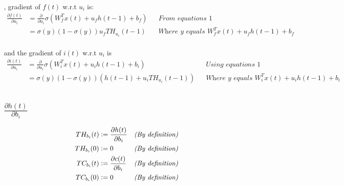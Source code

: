 \documentclass[twoside,11pt]{article}
\begin{document}
, gradient of $f(t)$  w.r.t $u_i$ is:
\begin{align*}
\frac{\partial f(t)}{\partial u_i} &=  \frac{\partial}{\partial u_i} \sigma(W_{f}^T x(t) + u_{f} h(t-1) + b_f) && \textit{From equations 1} \\
&= \sigma(y)(1-\sigma(y))u_f TH_{u_i}(t-1) && \textit{Where $y$ equals $W_{f}^T x(t) + u_{f} h(t-1) + b_f$} \\
\end{align*}

and the gradient of $i(t)$  w.r.t $u_i$ is
\begin{align*}
\frac{\partial i(t)}{\partial u_i} &=  \frac{\partial}{\partial u_i} \sigma(W_{i}^T x(t) + u_{i} h(t-1) + b_i) && \textit{Using equations 1} \\
&= \sigma(y)(1-\sigma(y)) \left (h(t-1)+ u_i TH_{u_{i}}(t-1) \right )&& \textit{Where $y$ equals $W_{i}^T x(t) + u_{i} h(t-1) + b_i$} \\
\end{align*}

\subsection{$\frac{\partial h(t)}{\partial b_i}$}

\begin{align}
TH_{b_i}(t)  & \vcentcolon = \frac{\partial h(t)}{\partial b_i}  && \textit{(By definition)}  \label{thb}\\
TH_{b_i}(0)  & \vcentcolon = 0  && \textit{(By definition)}  \\
TC_{b_i}(t)  & \vcentcolon = \frac{\partial c(t)}{\partial b_i}  && \textit{(By definition)}  \label{tcb}\\
TC_{b_i}(0)  & \vcentcolon = 0  && \textit{(By definition)} 
\end{align}
\end{document}
